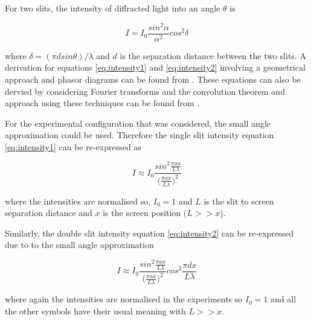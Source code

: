 \documentclass{article}
\begin{document}
\vspace{2mm}
\noindent
For two slits, the intensity of diffracted light into an angle $\theta$ \cite{Paper02} is

\begin{equation}
\label{eq:intensity2}
I = I_0 \frac{sin^2{\alpha}}{\alpha^2} cos^2{\delta}
\end{equation}

\vspace{2mm}
\noindent
where $\delta = ({\pi dsin{\theta}}) / {\lambda}$ and $d$ is the separation distance between the two slits. A derivation for equations \eqref{eq:intensity1} and \eqref{eq:intensity2} involving a geometrical approach and phasor diagrams can be found from \cite{Book01}. These equations can also be dervied by considering Fourier transforms and the convolution theorem and approach using these techniques can be found from \cite{Web01}.

\vspace{2mm}
\noindent
For the experimental configuration that was considered, the small angle approximation could be used. Therefore the single slit intensity equation \eqref{eq:intensity1} can be re-expressed as

\begin{equation}
\label{eq:intensity_small1}
I \approx I_0 \frac{sin^2{\frac{\pi a x}{L \lambda}}}{\big(\frac{\pi a x}{L \lambda}\big)^2}
\end{equation}

\vspace{2mm}
\noindent
where the intensities are normalised so, $I_0 = 1$ and $L$ is the slit to screen separation distance and $x$ is the screen position ($L >> x$).

\vspace{2mm}
\noindent
Similarly, the double slit intensity equation \eqref{eq:intensity2} can be re-expressed due to to the small angle approximation

\begin{equation}
\label{eq:intensity_small2}
I \approx I_0 \frac{sin^2{\frac{\pi a x}{L \lambda}}}{\big(\frac{\pi a x}{L \lambda}\big)^2} cos^2{\frac{\pi d x}{L \lambda}}
\end{equation}

\vspace{2mm}
\noindent
where again the intensities are normalised in the experiments so $I_0 = 1$ and all the other symbols have their usual meaning with $L >> x$.
\end{document}
